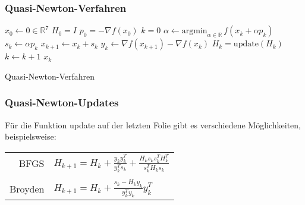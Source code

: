 \documentclass[xcolor = dvipsnames, notheorems, 10pt]{beamer}
\theoremstyle{definition}
\begin{document}
\begin{frame}
\frametitle{Quasi-Newton-Verfahren}
	\begin{algorithm}[H]
		\begin{algorithmic}[1]
			\STATE $x_0 \gets 0 \in \mathbb{R}^7$
			\STATE $H_0 = I$
			\STATE $p_0 = -\nabla f(x_0)$
			\STATE $k = 0$
				\STATE $\alpha \gets \text{argmin}_{\alpha \in \mathbb{R}}\, f(x_k + \alpha p_k)$
				\STATE $s_k \gets \alpha p_k$
				\STATE $x_{k+1} \gets x_k+s_k$
				\STATE $y_k \gets \nabla f(x_{k+1}) - \nabla f(x_k)$
				\STATE $H_k = \text{update}(H_k)$
				\STATE $k \gets k+1$
			\ENDWHILE
			\RETURN $x_k$
		\end{algorithmic}
		\caption{Quasi-Newton-Verfahren}
	\end{algorithm}
\end{frame}

\begin{frame}
\frametitle{Quasi-Newton-Updates}
	Für die Funktion update auf der letzten Folie gibt es verschiedene Möglichkeiten, beispielsweise:
	\begin{center}
		\begin{tabular}{r|l}
			BFGS 		&	$H_{k+1} = H_k + \frac{y_k y_k^T}{y_k^T s_k} + \frac{H_k s_k s_k^T H_k^T}{s_k^T H_k s_k}$\\
			& \\
			Broyden 	&	$H_{k+1} = H_k + \frac{s_k - H_k y_k}{y_k^T y_k} y_k^T$
		\end{tabular}
	\end{center}
\end{frame}
\end{document}
